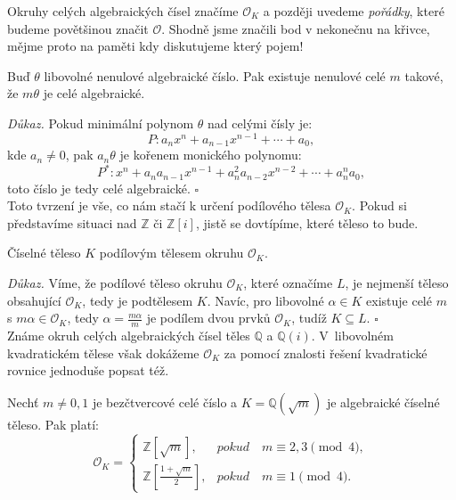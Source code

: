 \documentclass[12pt]{report}
\begin{document}
\begin{poznamka}
Okruhy celých algebraických čísel značíme $\mathcal{O}_K$ a později uvedeme \textit{pořádky}, které budeme povětšinou značit $\mathcal{O}$. Shodně jsme značili bod v nekonečnu na křivce, mějme proto na paměti kdy diskutujeme který pojem!
\end{poznamka}

\begin{lemma}\label{asob}
Buď $\theta$ libovolné nenulové algebraické číslo. Pak existuje nenulové celé $m$ takové, že $m \theta$ je celé algebraické.
\end{lemma}
\noindent \textit{Důkaz.} Pokud minimální polynom $\theta$ nad celými čísly je:
\begin{equation*}
P : a_n x^n + a_{n-1} x^{n-1} + \cdots + a_0,
\end{equation*}
kde $a_n \neq 0$, pak $a_n \theta$ je kořenem monického polynomu:
\begin{equation*}
P^* : x^n +a_n  a_{n-1} x^{n-1} + a_n ^2 a_{n-2} x^{n-2} + \cdots + a_n ^n a_0,
\end{equation*}
toto číslo je tedy celé algebraické. \hfill $\square$\\

Toto tvrzení je vše, co nám stačí k určení podílového tělesa $\mathcal{O}_K$. Pokud si představíme situaci nad $\mathbb{Z}$ či $\mathbb{Z}[i]$, jistě se dovtípíme, které těleso to bude.

\begin{dusledek}
Číselné těleso $K$ podílovým tělesem okruhu $\mathcal{O}_K$. 
\end{dusledek}
\noindent \textit{Důkaz.} Víme, že podílové těleso okruhu $\mathcal{O}_K$, které označíme $L$, je nejmenší těleso obsahující $\mathcal{O}_K$, tedy je podtělesem $K$. Navíc, pro libovolné $\alpha \in K$ existuje celé $m$ s $m \alpha \in \mathcal{O}_K$, tedy $\alpha = \frac{m \alpha}{m}$ je podílem dvou prvků $\mathcal{O}_K$, tudíž $K \subseteq L$. \hfill $\square$\\

Známe okruh celých algebraických čísel těles $\mathbb{Q}$ a $\mathbb{Q}(i)$. V~libovolném kvadratickém tělese však dokážeme $\mathcal{O}_K$ za pomocí znalosti řešení kvadratické rovnice jednoduše popsat též.

 \begin{veta}\label{cela}
Nechť $m \neq 0,1$ je bezčtvercové celé číslo a $K = \mathbb{Q}(\sqrt{m})$ je algebraické číselné těleso. Pak platí:
\begin{equation*}
\mathcal{O}_K = \begin{cases}
      \mathbb{Z}[\sqrt{m}], & \textit{pokud} \quad  m \equiv 2,3 \pmod{4},\\
      \mathbb{Z}\left[\frac{1+\sqrt{m}}{2}\right], & \textit{pokud} \quad m \equiv 1 \pmod{4}.
    \end{cases}
\end{equation*}
\end{veta}
\end{document}
